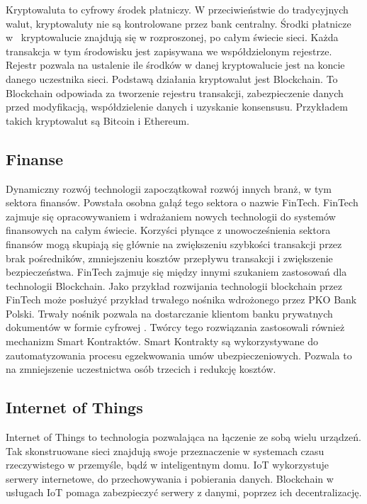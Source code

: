 \documentclass[a4paper,12pt]{book}
\begin{document}
Kryptowaluta to cyfrowy środek płatniczy. W przeciwieństwie do tradycyjnych walut, kryptowaluty nie są kontrolowane przez bank centralny. Środki płatnicze w~ kryptowalucie znajdują się w rozproszonej, po całym świecie sieci. Każda transakcja w tym środowisku jest zapisywana we współdzielonym rejestrze. Rejestr pozwala na ustalenie ile środków w danej kryptowalucie jest na koncie danego uczestnika sieci. Podstawą działania kryptowalut jest Blockchain. To Blockchain odpowiada za tworzenie rejestru transakcji, zabezpieczenie danych przed modyfikacją, współdzielenie danych i uzyskanie konsensusu. Przykładem takich kryptowalut są Bitcoin i Ethereum. \cite{bitcoin}

\subsection{Finanse}

Dynamiczny rozwój technologii zapoczątkował rozwój innych branż, w tym sektora finansów. Powstała osobna gałąź tego sektora o nazwie FinTech. FinTech zajmuje się opracowywaniem i wdrażaniem nowych technologii do systemów finansowych na całym świecie. Korzyści płynące z unowocześnienia sektora finansów mogą skupiają się głównie na zwiększeniu szybkości transakcji przez brak pośredników, zmniejszeniu kosztów przepływu transakcji i zwiększenie bezpieczeństwa. FinTech zajmuje się między innymi szukaniem zastosowań dla technologii Blockchain. Jako przykład rozwijania technologii blockchain przez FinTech może posłużyć przykład trwałego nośnika wdrożonego przez PKO Bank Polski. Trwały nośnik pozwala na dostarczanie klientom banku prywatnych dokumentów w formie cyfrowej \cite{PKO}. Twórcy tego rozwiązania zastosowali również mechanizm Smart Kontraktów. Smart Kontrakty są wykorzystywane do zautomatyzowania procesu egzekwowania umów ubezpieczeniowych\cite{PKO-SMART}. Pozwala to na zmniejszenie uczestnictwa osób trzecich i redukcję kosztów.

\subsection{Internet of Things}

Internet of Things to technologia pozwalająca na łączenie ze sobą wielu urządzeń. Tak skonstruowane sieci znajdują swoje przeznaczenie w systemach czasu rzeczywistego w przemyśle, bądź w inteligentnym domu. IoT wykorzystuje serwery internetowe, do przechowywania i pobierania danych. Blockchain w usługach IoT pomaga zabezpieczyć serwery z danymi, poprzez ich decentralizację. \cite{abiot}
\end{document}
